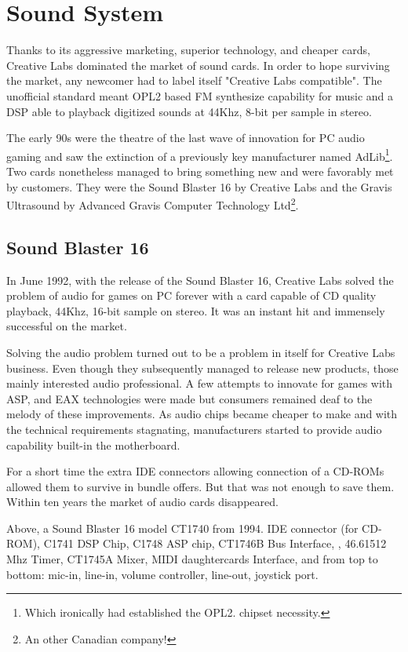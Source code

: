 \section{Sound System}
Thanks to its aggressive marketing, superior technology, and cheaper cards, Creative Labs dominated the market of sound cards. In order to hope surviving the market, any newcomer had to label itself "Creative Labs compatible". The unofficial standard meant OPL2 based FM synthesize capability for music and a DSP able to playback digitized sounds at 44Khz, 8-bit per sample in stereo.\\
\par
 The early 90s were the theatre of the last wave of innovation for PC audio gaming and saw the extinction of a previously key manufacturer named AdLib\footnote{Which ironically had established the OPL2. chipset necessity.}. Two cards nonetheless managed to bring something new and were favorably met by customers. They were the Sound Blaster 16 by Creative Labs and the Gravis Ultrasound by Advanced Gravis Computer Technology Ltd\footnote{An other Canadian company!}.\\
\par
\subsection{Sound Blaster 16}
 In June 1992, with the release of the Sound Blaster 16, Creative Labs solved the problem of audio for games on PC forever with a card capable of CD quality playback, 44Khz, 16-bit sample on stereo. It was an instant hit and immensely successful on the market.\\
\par
{}
\par
Solving the audio problem turned out to be a problem in itself for Creative Labs business. Even though they subsequently managed to release new products, those mainly interested audio professional. A few attempts to innovate for games with ASP, and EAX technologies were made but consumers remained deaf to the melody of these improvements. As audio chips became cheaper to make and with the technical requirements stagnating, manufacturers started to provide audio capability built-in the motherboard.\\
\par
For a short time the extra IDE connectors allowing connection of a CD-ROMs allowed them to survive in bundle offers. But that was not enough to save them. Within ten years the market of audio cards disappeared.\\
\par
{}
\par
Above, a Sound Blaster 16 model CT1740 from 1994.  IDE connector (for CD-ROM),  C1741 DSP Chip,  C1748 ASP chip,  CT1746B Bus Interface, , 46.61512 Mhz Timer,  CT1745A Mixer,  MIDI daughtercards Interface, and  from top to bottom: mic-in, line-in, volume controller, line-out, joystick port.







